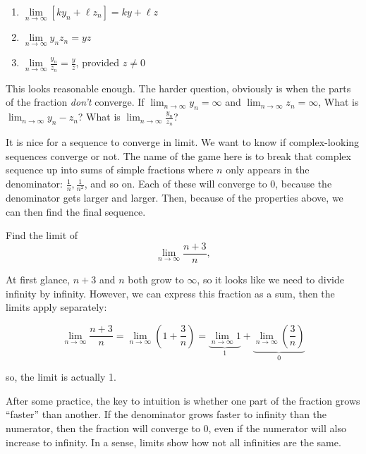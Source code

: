 \documentclass[]{book}
\providecommand{\tightlist}{%
  \setlength{\itemsep}{0pt}\setlength{\parskip}{0pt}}
\theoremstyle{definition}
\theoremstyle{definition}
\theoremstyle{definition}
\theoremstyle{remark}
\let\BeginKnitrBlock\begin \let\EndKnitrBlock\end
\begin{document}
\begin{enumerate}
\def\labelenumi{\arabic{enumi}.}
\tightlist
\item
  \(\lim\limits_{n \to \infty} [k y_n + \ell z_n]= k y + \ell z\)
\item
  \(\lim\limits_{n \to \infty} y_n z_n = yz\)
\item
  \(\lim\limits_{n \to \infty} \frac{y_n}{z_n} = \frac{y}{z}\), provided
  \(z\neq 0\)
\end{enumerate}

This looks reasonable enough. The harder question, obviously is when the
parts of the fraction \emph{don't} converge. If
\(\lim_{n\to\infty} y_n = \infty\) and
\(\lim_{n\to\infty} z_n = \infty\), What is
\(\lim_{n\to\infty} y_n - z_n\)? What is
\(\lim_{n\to\infty} \frac{y_n}{z_n}\)?

It is nice for a sequence to converge in limit. We want to know if
complex-looking sequences converge or not. The name of the game here is
to break that complex sequence up into sums of simple fractions where
\(n\) only appears in the denominator: \(\frac{1}{n}, \frac{1}{n^2}\),
and so on. Each of these will converge to 0, because the denominator
gets larger and larger. Then, because of the properties above, we can
then find the final sequence.

\BeginKnitrBlock{example}[Simplifying a Fraction into Sums]
\protect\hypertarget{exm:unnamed-chunk-3}{}{\label{exm:unnamed-chunk-3}
{} }Find the limit of
\[\lim_{n\to \infty} \frac{n + 3}{n},\]
\EndKnitrBlock{example}

\BeginKnitrBlock{solution}
{}At first glance, \(n + 3\) and \(n\) both
grow to \(\infty\), so it looks like we need to divide infinity by
infinity. However, we can express this fraction as a sum, then the
limits apply separately:

\[\lim_{n\to \infty} \frac{n + 3}{n} = \lim_{n\to \infty} \left(1 + \frac{3}{n}\right) =  \underbrace{\lim_{n\to \infty}1}_{1} +  \underbrace{\lim_{n\to \infty}\left(\frac{3}{n}\right)}_{0}\]

so, the limit is actually 1.
\EndKnitrBlock{solution}

After some practice, the key to intuition is whether one part of the
fraction grows ``faster'' than another. If the denominator grows faster
to infinity than the numerator, then the fraction will converge to 0,
even if the numerator will also increase to infinity. In a sense, limits
show how not all infinities are the same.
\end{document}
